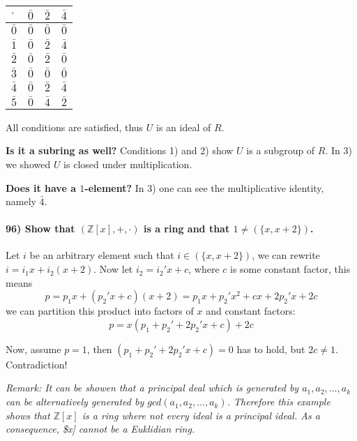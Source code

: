 \documentclass[
]{article}
\begin{document}
\begin{longtable}[]{@{}llll@{}}
\toprule()
\(\cdot\) & \(\bar 0\) & \(\bar 2\) & \(\bar 4\) \\
\midrule()
\endhead
\(\bar 0\) & \(\bar 0\) & \(\bar 0\) & \(\bar 0\) \\
\(\bar 1\) & \(\bar 0\) & \(\bar 2\) & \(\bar 4\) \\
\(\bar 2\) & \(\bar 0\) & \(\bar 2\) & \(\bar 0\) \\
\(\bar 3\) & \(\bar 0\) & \(\bar 0\) & \(\bar 0\) \\
\(\bar 4\) & \(\bar 0\) & \(\bar 2\) & \(\bar 4\) \\
\(\bar 5\) & \(\bar 0\) & \(\bar 4\) & \(\bar 2\) \\
\bottomrule()
\end{longtable}

All conditions are satisfied, thus \(U\) is an ideal of \(R\).

\textbf{Is it a subring as well?} Conditions 1) and 2) show \(U\) is a
subgroup of \(R\). In 3) we showed \(U\) is closed under multiplication.

\textbf{Does it have a \(1\)-element?} In 3) one can see the
multiplicative identity, namely \(\bar 4\).

\hypertarget{show-that-mathbbzx-cdot-is-a-ring-and-that-1-neq-x-x2.}{%
\paragraph{\texorpdfstring{96) Show that \((\mathbb{Z}[x], +, \cdot)\)
is a ring and that
\(1 \neq (\{x, x+2\})\).}{96) Show that (\textbackslash mathbb\{Z\}{[}x{]}, +, \textbackslash cdot) is a ring and that 1 \textbackslash neq (\textbackslash\{x, x+2\textbackslash\}).}}\label{show-that-mathbbzx-cdot-is-a-ring-and-that-1-neq-x-x2.}}

Let \(i\) be an arbitrary element such that \(i \in (\{x, x+2\})\), we
can rewrite \(i = i_1 x + i_2(x+2)\). Now let \(i_2 = i_2'x + c\), where
\(c\) is some constant factor, this means \[
p = p_1 x + (p_2'x+c)(x+2) = p_1 x + p_2'x^2 + cx + 2p_2'x + 2c
\] we can partition this product into factors of \(x\) and constant
factors: \[
p = x(p_1 + p_2' + 2p_2' x + c) + 2c
\]

Now, assume \(p = 1\), then \((p_1 + p_2' + 2p_2' x + c) = 0\) has to
hold, but \(2c \neq 1\). Contradiction!

\emph{Remark: It can be showen that a principal deal which is generated
by \(a_1,a_2,\dots,a_k\) can be alternatively generated by
\(gcd(a_1,a_2, \dots, a_k)\). Therefore this example shows that
\(\mathbb{Z}[x]\) is a ring where not every ideal is a principal ideal.
As a consequence, \$\mathbb{Z}{[}x{]} cannot be a Euklidian ring.}
\end{document}
